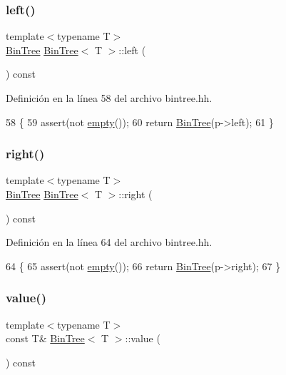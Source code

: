 \subsubsection{\texorpdfstring{left()}{left()}}
{\footnotesize\ttfamily template$<$typename T$>$ \\
\hyperlink{class_bin_tree}{Bin\+Tree} \hyperlink{class_bin_tree}{Bin\+Tree}$<$ T $>$\+::left (\begin{DoxyParamCaption}{ }\end{DoxyParamCaption}) const}



Definición en la línea 58 del archivo bintree.\+hh.


\begin{DoxyCode}
58                           \{
59         assert(not \hyperlink{class_bin_tree_a74cda259ba5c25b8ee38ed4dc33e4fad}{empty}());
60         \textcolor{keywordflow}{return} \hyperlink{class_bin_tree_a47eef22d29cd023449d97c073c08e5b6}{BinTree}(p->left);
61     \}
\end{DoxyCode}
\mbox{\label{class_bin_tree_aff8e96651b27284c329667b5ad3e4d0b}} 
\subsubsection{\texorpdfstring{right()}{right()}}
{\footnotesize\ttfamily template$<$typename T$>$ \\
\hyperlink{class_bin_tree}{Bin\+Tree} \hyperlink{class_bin_tree}{Bin\+Tree}$<$ T $>$\+::right (\begin{DoxyParamCaption}{ }\end{DoxyParamCaption}) const}



Definición en la línea 64 del archivo bintree.\+hh.


\begin{DoxyCode}
64                            \{
65         assert(not \hyperlink{class_bin_tree_a74cda259ba5c25b8ee38ed4dc33e4fad}{empty}());
66         \textcolor{keywordflow}{return} \hyperlink{class_bin_tree_a47eef22d29cd023449d97c073c08e5b6}{BinTree}(p->right);
67     \}
\end{DoxyCode}
\mbox{\label{class_bin_tree_a734e785b089c87b49187ee7c58edf5f3}} 
\subsubsection{\texorpdfstring{value()}{value()}}
{\footnotesize\ttfamily template$<$typename T$>$ \\
const T\& \hyperlink{class_bin_tree}{Bin\+Tree}$<$ T $>$\+::value (\begin{DoxyParamCaption}{ }\end{DoxyParamCaption}) const}



